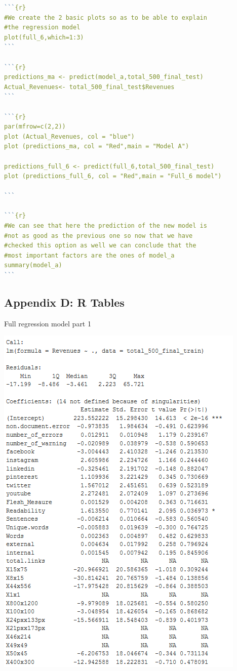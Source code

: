 \documentclass{article}
\begin{document}
\begin{lstlisting}[language=R]
```{r}
#We create the 2 basic plots so as to be able to explain 
#the regression model
plot(full_6,which=1:3)
```

```{r}
predictions_ma <- predict(model_a,total_500_final_test)
Actual_Revenues<- total_500_final_test$Revenues
```

```{r}
par(mfrow=c(2,2))
plot (Actual_Revenues, col = "blue")
plot (predictions_ma, col = "Red",main = "Model A")

predictions_full_6 <- predict(full_6,total_500_final_test)
plot (predictions_full_6, col = "Red",main = "Full_6 model")

```

```{r}
#We can see that here the prediction of the new model is 
#not as good as the previous one so now that we have 
#checked this option as well we can conclude that the 
#most important factors are the ones of model_a
summary(model_a)
```
\end{lstlisting} 


\subsection{Appendix D: R Tables} \label{appR}
\begin{table}[H]
\centering
\caption{Full regression model part 1}\label{d :r :1a}
\begin{center}
\includegraphics[scale=0.8]{../R/photos/66_FULL_PART1.PNG} \\
\end{center}
\end{table}
\end{document}
